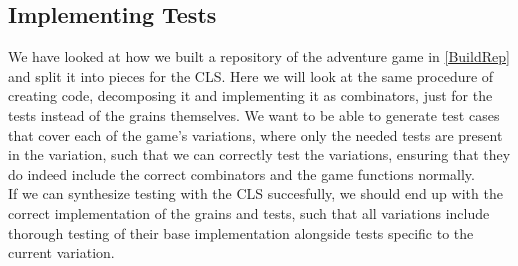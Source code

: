 \subsection{Implementing Tests}
We have looked at how we built a repository of the adventure game in \autoref{BuildRep} and split it into pieces for the CLS. Here we will look at the same procedure of creating code, decomposing it and implementing it as combinators, just for the tests instead of the grains themselves. We want to be able to generate test cases that cover each of the game's variations, where only the needed tests are present in the variation, such that we can correctly test the variations, ensuring that they do indeed include the correct combinators and the game functions normally. \\
If we can synthesize testing with the CLS succesfully, we should end up with the correct implementation of the grains and tests, such that all variations include thorough testing of their base implementation alongside tests specific to the current variation.  
